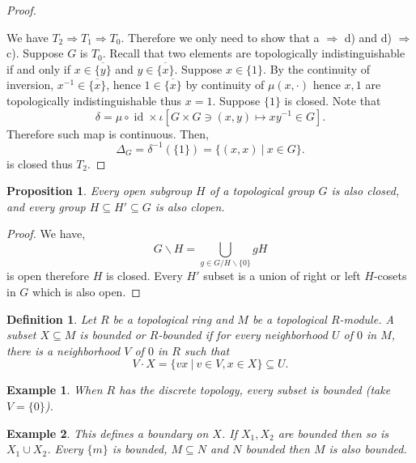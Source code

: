 \documentclass[8pt]{article}
\numberwithin{equation}{section}
\newtheorem{proposition}{Proposition}[subsection]
\newtheorem{definition}{Definition}[subsection]
\newtheorem{example}{Example}[subsection]
\DeclareMathOperator{\id}{id}
\newcommand{\sep}[0]{\:|\:}
\begin{document}
\begin{proof}$\:$
    \par We have $T_2\Rightarrow T_1\Rightarrow T_0$. Therefore we only need to show that a $\Rightarrow$ d) and d) $\Rightarrow$ c). Suppose $G$ is $T_0$. Recall that two elements are topologically indistinguishable if and only if $x\in\overline{\{y\}}$ and $y\in\overline{\{x\}}$. Suppose $x\in\{1\}$. By the continuity of inversion, $x^{-1}\in\overline{\{x\}}$, hence $1\in\overline{\{x\}}$ by continuity of $\mu(x,\cdot)$ hence $x,1$ are topologically indistinguishable thus $x=1$. 
    Suppose $\{1\}$ is closed. Note that 
    \begin{equation*}
      \delta =  \mu\circ\id\times \iota [G\times G\ni (x,y)\mapsto xy^{-1}\in G].
    \end{equation*}
    Therefore such map is continuous. Then,
    \begin{equation*}
        \Delta_G = \delta^{-1}(\{1\}) = \{(x,x)\sep x\in G\}.
    \end{equation*}
    is closed thus $T_2$.
\end{proof}
\begin{proposition}
    \label{fact_11_2}
    Every open subgroup $H$ of a topological group $G$ is also closed, and every group $H\subseteq H'\subseteq G$ is also clopen.
\end{proposition}
\begin{proof}
We have,
\begin{equation*}
    G\backslash H = \bigcup_{g\in G/H\backslash\{0\}}gH
\end{equation*}
is open therefore $H$ is closed. Every $H'$ subset is a union of right or left $H$-cosets in $G$ which is also open.
\end{proof}
\begin{definition}
    \label{definition_11_2}
    Let $R$ be a topological ring and $M$ be a topological $R$-module. A subset $X\subseteq M$ is bounded or $R$-bounded if for every neighborhood $U$ of $0$ in $M$, there is a neighborhood $V$ of $0$ in $R$ such that 
    \begin{equation*}
        V\cdot X = \{vx \sep v\in V,x\in X\}\subseteq U.
    \end{equation*}
\end{definition}
\begin{example}
    When $R$ has the discrete topology, every subset is bounded (take $V=\{0\}$).
\end{example}
\begin{example}
    This defines a boundary on $X$. If $X_1,X_2$ are bounded then so is $X_1\cup X_2$. Every $\{m\}$ is bounded, $M\subseteq N$ and $N$ bounded then $M$ is also bounded.
\end{example}
\end{document}
